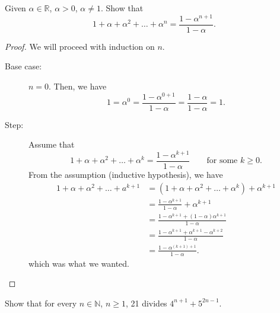 
\begin{eg}
	Given \( \alpha  \in \mathbb{R} \), \( \alpha  >  0\), \( \alpha  \neq  1 \). Show that \[
		1 + \alpha  + \alpha ^2 + \ldots + \alpha ^n = \frac{1-\alpha ^{n+1}}{1 - \alpha }
	.\] 
\end{eg}

\begin{proof}
	We will proceed with induction on \( n \).
	\begin{description}
		\item[Base case:] \( n = 0 \). Then, we have \[
			1 = \alpha ^0 = \frac{1-\alpha ^{0+1}}{1-\alpha } = \frac{1-\alpha }{1-\alpha } = 1
		.\] 
		\item[Step:] Assume that \[
			1 + \alpha  + \alpha ^2 + \ldots  + \alpha ^k = \frac{1-\alpha ^{k+1}}{1-\alpha } \qquad \text{for some } k \ge 0
		.\] From the assumption (inductive hypothesis), we have 
		\begin{align*}
			1 + \alpha  + \alpha ^2 + \ldots  + a^{k+1} &= (1 + \alpha  + \alpha^2 + \ldots  + \alpha ^k) + \alpha^{k+1} \\
																									&= \frac{1-\alpha ^{k+1}}{1-\alpha } + \alpha ^{k+1} \\
																									&= \frac{1-\alpha ^{k+1} + (1-\alpha )\alpha ^{k+1}}{1-\alpha } \\
																									&= \frac{1-\alpha ^{k+1} + \alpha ^{k+1} - \alpha ^{k+2}}{1-\alpha } \\
																									&= \frac{1-\alpha ^{(k+1) + 1}}{1-\alpha }
		.\end{align*}
		which was what we wanted.
	\end{description}
\end{proof}

\begin{eg}
	Show that for every \( n \in \mathbb{N} \), \( n \ge 1 \), 21 divides \( 4^{n+1} + 5^{2n-1} \).
\end{eg}


